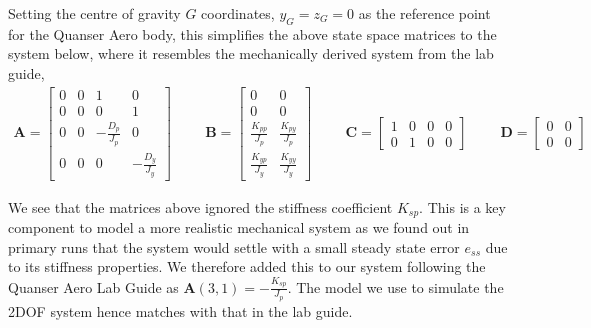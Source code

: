 \documentclass[11pt]{article}
\begin{document}
Setting the centre of gravity $G$ coordinates, $y_G = z_G = 0$ as the reference point for the Quanser Aero body, this simplifies the above state space matrices to the system below, where it resembles the mechanically derived system from the lab guide,
\begin{align*}
\mathbf{A} = \begin{bmatrix}
    0 & 0 & 1 & 0\\
    0 & 0 & 0 & 1\\
    0 & 0 & -\frac{D_p}{J_p} & 0\\
    0 & 0 & 0 & -\frac{D_y}{J_y}
    \end{bmatrix} \hspace{1cm}
\mathbf{B} = \begin{bmatrix}
    0 & 0\\
    0 & 0\\
    \frac{K_{pp}}{J_p} & \frac{K_{py}}{J_p}\\
    \frac{K_{yp}}{J_y} & \frac{K_{yy}}{J_y}
    \end{bmatrix} \hspace{1cm}
\mathbf{C} = \begin{bmatrix}
    1 & 0 & 0 & 0\\
    0 & 1 & 0 & 0
    \end{bmatrix} \hspace{1cm}
\mathbf{D} = \begin{bmatrix}
    0 & 0\\
    0 & 0
\end{bmatrix}
\end{align*}

We see that the matrices above ignored the stiffness coefficient $K_{sp}$. This is a key component to model a more realistic mechanical system as we found out in primary runs that the system would settle with a small steady state error $e_{ss}$ due to its stiffness properties. We therefore added this to our system following the Quanser Aero Lab Guide as $\mathbf{A}(3,1) = -\frac{K_{sp}}{J_p}$. The model we use to simulate the 2DOF system hence matches with that in the lab guide.\\
\end{document}

